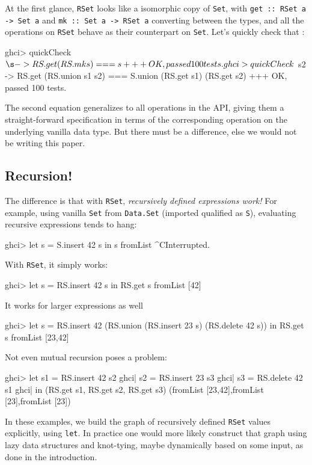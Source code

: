 \documentclass[manuscript,anonymous,screen,acmsmall]{acmart}
\begin{document}
At the first glance, \verb|RSet| looks like a isomorphic copy of \verb|Set|, with \verb|get :: RSet a -> Set a| and \verb|mk :: Set a -> RSet a| converting between the types, and all the operations on \verb|RSet| behave as their counterpart on \verb|Set|. Let's quickly check that \citep{quickcheck}:
\begin{code}
ghci> quickCheck $ \s -> RS.get (RS.mk s) === s
+++ OK, passed 100 tests.
ghci> quickCheck $  s2 -> RS.get (RS.union s1 s2) === S.union (RS.get s1) (RS.get s2)
+++ OK, passed 100 tests.
\end{code}

The second equation generalizes to all operations in the API, giving them a straight-forward specification in terms of the corresponding operation on the underlying vanilla data type. But there must be a difference, else we would not be writing this paper.

\subsection{Recursion!}

The difference is that with \verb|RSet|, \emph{recursively defined expressions work!} For example, using vanilla \verb|Set| from \verb|Data.Set| (imported qualified as \verb|S|), evaluating recursive expressions tends to hang:
\begin{code}
ghci> let s = S.insert 42 s in s
fromList ^CInterrupted.
\end{code}
With \verb|RSet|, it simply works:
\begin{code}
ghci> let s = RS.insert 42 s in RS.get s
fromList [42]
\end{code}
It works for larger expressions as well
\begin{code}
ghci> let s = RS.insert 42 (RS.union (RS.insert 23 s) (RS.delete 42 s)) in RS.get s
fromList [23,42]
\end{code}
Not even mutual recursion poses a problem:
\begin{code}
ghci> let  s1 = RS.insert 42 s2
ghci|      s2 = RS.insert 23 s3
ghci|      s3 = RS.delete 42 s1
ghci| in (RS.get s1, RS.get s2, RS.get s3)
(fromList [23,42],fromList [23],fromList [23])
\end{code}

In these examples, we build the graph of recursively defined \verb|RSet| values explicitly, using \verb|let|. In practice one would more likely construct that graph using lazy data structures and knot-tying, maybe dynamically based on some input, as done in the introduction.
\end{document}
